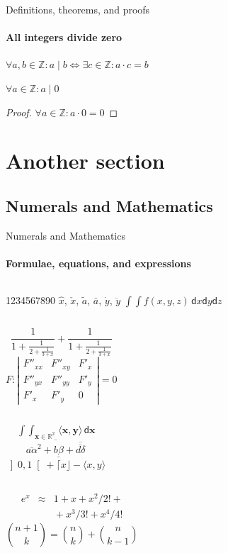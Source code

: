 \documentclass[compress]{beamer}
\begin{document}
\begin{frame}[label=proof]{Definitions, theorems, and proofs}
\framesubtitle{All integers divide zero}
\begin{definition}
$\forall a,b\in\mathds{Z}: a\mid b\iff\exists c\in\mathds{Z}:a\cdot c=b$
\end{definition}
\begin{theorem}
$\forall a\in\mathds{Z}: a\mid 0$
\end{theorem}
\begin{proof}[Proof\nopunct]
$\forall a\in\mathds{Z}: a\cdot 0=0$
\end{proof}
\end{frame}

\section{Another section}
\subsection{Numerals and Mathematics}
\begin{frame}[label=math]{Numerals and Mathematics}
\framesubtitle{Formulae, equations, and expressions}
\begin{columns}[onlytextwidth]
1234567890
$\hat{x}$, $\check{x}$, $\tilde{a}$,
$\bar{a}$, $\dot{y}$, $\ddot{y}$
$\int \!\! \int f(x,y,z)\,\mathsf{d}x\mathsf{d}y\mathsf{d}z$
\end{columns}
\begin{columns}[onlytextwidth]
$$\frac{1}{\displaystyle 1+
\frac{1}{\displaystyle 2+
\frac{1}{\displaystyle 3+x}}} +
\frac{1}{1+\frac{1}{2+\frac{1}{3+x}}}$$
$$F:\left| \begin{array}{ccc}
F''_{xx} & F''_{xy} &  F'_x \\
F''_{yx} & F''_{yy} &  F'_y \\
F'_x     & F'_y     & 0
\end{array}\right| = 0$$
\end{columns}
\begin{columns}[onlytextwidth]
$$\mathop{\int \!\!\! \int}_{\mathbf{x} \in \mathds{R}^2}
\! \langle \mathbf{x},\mathbf{y}\rangle\,\mathsf{d}\mathbf{x}$$
$$\overline{\overline{a\alpha}^2+\underline{b\beta}
+\overline{\overline{d\delta}}}$$
$\left] 0,1\right[ + \lceil x \rfloor - \langle x,y\rangle$
\end{columns}
\begin{columns}[onlytextwidth]
\begin{eqnarray*}
e^x &\approx& 1+x+x^2/2! + \\
&& {}+x^3/3! + x^4/4!
\end{eqnarray*}
$${n+1\choose k} = {n\choose k} + {n \choose k-1}$$
\end{columns}
\end{frame}
\end{document}
